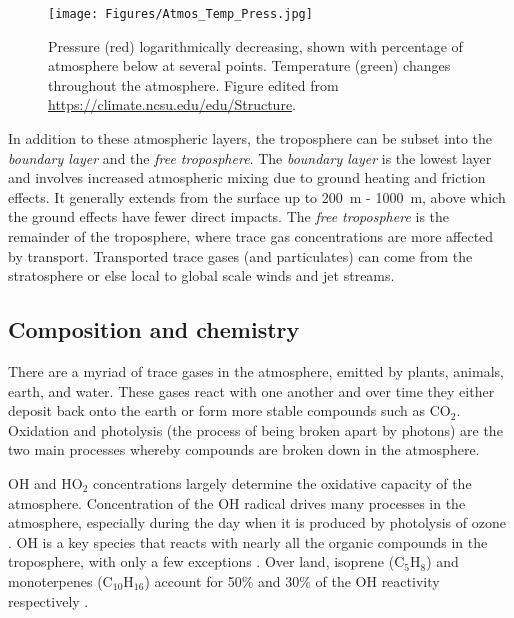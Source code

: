    \begin{figure}
      \texttt{[image: Figures/Atmos\_Temp\_Press.jpg]}
      \caption{%
        Pressure (red) logarithmically decreasing, shown with percentage of atmosphere below at several points.
        Temperature (green) changes throughout the atmosphere.
        Figure edited from \url{https://climate.ncsu.edu/edu/Structure}.
      }
      \label{LR:Atmos:Struct:Fig_atmos_layers}
    \end{figure}
    
    
    
    In addition to these atmospheric layers, the troposphere can be subset into the \textit{boundary layer} and the \textit{free troposphere}.
    The \textit{boundary layer} is the lowest layer and involves increased atmospheric mixing due to ground heating and friction effects.
    It generally extends from the surface up to 200~m - 1000~m, above which the ground effects have fewer direct impacts.
    The \textit{free troposphere} is the remainder of the troposphere, where trace gas concentrations are more affected by transport.
    Transported trace gases (and particulates) can come from the stratosphere or else local to global scale winds and jet streams.
    
    
  \subsection{Composition and chemistry}
  \label{LR:Atmos:Chem}
        
    There are a myriad of trace gases in the atmosphere, emitted by plants, animals, earth, and water. 
    These gases react with one another and over time they either deposit back onto the earth or form more stable compounds such as CO$_2$.
    Oxidation and photolysis (the process of being broken apart by photons) are the two main processes whereby compounds are broken down in the atmosphere.
    
    
    OH and HO$_2$ concentrations largely determine the oxidative capacity of the atmosphere.
    Concentration of the OH radical drives many processes in the atmosphere, especially during the day when it is produced by photolysis of ozone \parencite{Atkinson2000}.
    OH is a key species that reacts with nearly all the organic compounds in the troposphere, with only a few exceptions \parencite{Atkinson2000}.
    Over land, isoprene (C$_5$H$_8$) and monoterpenes (C$_{10}$H$_{16}$) account for 50\% and 30\% of the OH reactivity respectively \parencite{Fuentes2000}.
    

